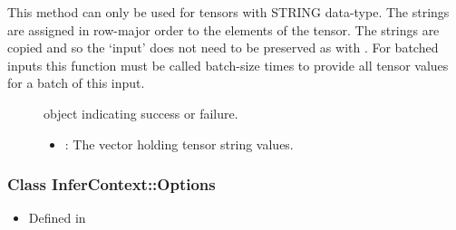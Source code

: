 \documentclass[letterpaper,10pt,english]{sphinxmanual}
\begin{document}
\begin{fulllineitems}
\begin{fulllineitems}
This method can only be used for tensors with STRING data-type. The strings are assigned in row-major order to the elements of the tensor. The strings are copied and so the ‘input’ does not need to be preserved as with {\hyperref[\detokenize{cpp_api/classnvidia_1_1inferenceserver_1_1client_1_1InferContext_1_1Input:classnvidia_1_1inferenceserver_1_1client_1_1InferContext_1_1Input_1a414fe9afbb60a48f162bac5439beee4d}]{}}. For batched inputs this function must be called batch-size times to provide all tensor values for a batch of this input. \begin{description}
\item[{}] \leavevmode
{\hyperref[\detokenize{cpp_api/classnvidia_1_1inferenceserver_1_1client_1_1Error:classnvidia_1_1inferenceserver_1_1client_1_1Error}]{}} object indicating success or failure. 

\item[{}] \leavevmode\begin{itemize}
\item {} 
: The vector holding tensor string values. 

\end{itemize}

\end{description}


\end{fulllineitems}


\end{fulllineitems}



\subsubsection{Class InferContext::Options}
\label{\detokenize{cpp_api/classnvidia_1_1inferenceserver_1_1client_1_1InferContext_1_1Options:class-infercontext-options}}\label{\detokenize{cpp_api/classnvidia_1_1inferenceserver_1_1client_1_1InferContext_1_1Options:exhale-class-classnvidia-1-1inferenceserver-1-1client-1-1infercontext-1-1options}}\label{\detokenize{cpp_api/classnvidia_1_1inferenceserver_1_1client_1_1InferContext_1_1Options::doc}}\begin{itemize}
\item {} 
Defined in {\hyperref[\detokenize{cpp_api/file_src_clients_c++_request.h:file-src-clients-c-request-h}]{}}

\end{itemize}
\end{document}
